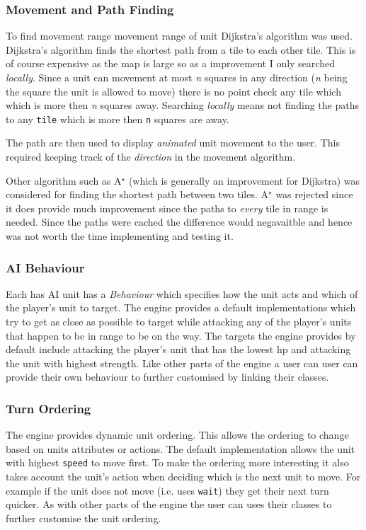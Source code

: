 \subsubsection{Movement and Path Finding}

To find movement range movement range of unit Dijkstra's algorithm was used. Dijkstra's algorithm finds the shortest path from a tile to each other tile. This is of course expensive as the map is large so as a improvement I only searched \emph{locally}. Since a unit can movement at most \emph{n} squares in any direction (\emph{n} being the square the unit is allowed to move) there is no point check any tile which which is more then \emph{n} squares away.  Searching \emph{locally} means not finding the paths to any \texttt{tile} which is more then \texttt{n} squares are away.

The path are then used to display \emph{animated} unit movement to the user.  This required keeping track of the \emph{direction} in the movement algorithm. 

\def\astar{A$^{\star}$ }

Other algorithm such as \astar (which is generally an improvement for Dijkstra) was considered for finding the shortest path between two tiles. \astar was rejected since it does  provide much improvement since the paths to \emph{every} tile in range is needed. Since the paths were cached the difference would negavaitble and hence was not worth the time implementing and testing it.


\subsubsection{AI Behaviour}
Each has AI unit has a \emph{Behaviour} which specifies how the unit acts and which of the player's unit to target.  The engine provides a default implementations which try to get as close as possible to target while attacking any of the player's units that happen to be in range to be on the way.  The targets the engine provides by default include attacking the player's unit that has the lowest hp and attacking the unit with highest strength. Like other parts of the engine a user can user can provide their own behaviour to further customised by linking their classes.

\subsubsection{Turn Ordering}
The engine provides dynamic unit ordering.  This allows the ordering to change based on units attributes or actions.  The default implementation allows the unit with highest \texttt{speed} to move first.  To make the ordering more interesting it also takes account the unit's action when deciding which is the next unit to move. For example if the unit does not move (i.e. uses \texttt{wait}) they get their next turn quicker. As with other parts of the engine the user can uses their classes to further customise the unit ordering.

